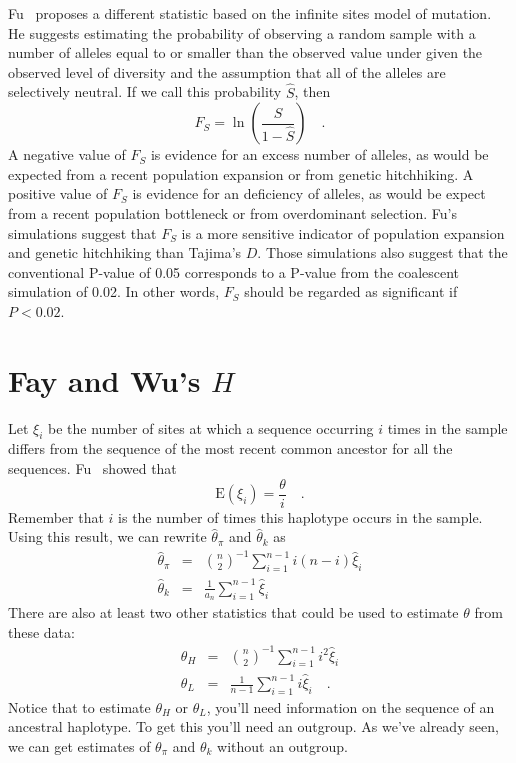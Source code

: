 \documentclass[12pt]{article}
\begin{document}
Fu~\cite{Fu-1997} proposes a different statistic based on the infinite
sites model of mutation. He suggests estimating the probability of
observing a random sample with a number of alleles equal to or smaller
than the observed value under given the observed level of diversity
and the assumption that all of the alleles are selectively neutral. If
we call this probability $\hat S$, then
\[
F_S = \ln\left(\frac{\hat S}{1 - \hat S}\right) \quad .
\]
A negative value of $F_S$ is evidence for an excess number of alleles,
as would be expected from a recent population expansion or from
genetic hitchhiking. A positive value of $F_S$ is evidence for an
deficiency of alleles, as would be expect from a recent population
bottleneck or from overdominant selection. Fu's simulations suggest
that $F_S$ is a more sensitive indicator of population expansion and
genetic hitchhiking than Tajima's $D$. Those simulations also suggest
that the conventional P-value of 0.05 corresponds to a P-value from
the coalescent simulation of 0.02. In other words, $F_S$ should be
regarded as significant if $P < 0.02$.

\section*{Fay and Wu's $H$}

Let $\xi_i$ be the number of sites at which a sequence occurring $i$
times in the sample differs from the sequence of the most recent
common ancestor for all the sequences. Fu~\cite{Fu-1995} showed that
\[
\mbox{E}(\xi_i) = \frac{\theta}{i} \quad .
\]
Remember that $i$ is the number of times this haplotype occurs in the
sample. Using this result, we can rewrite $\hat\theta_\pi$ and
$\hat\theta_k$ as
\begin{eqnarray*}
\hat\theta_\pi &=& {n \choose 2}^{-1}\sum_{i=1}^{n-1}i(n-i)\hat\xi_i \\
\hat\theta_k  &=& \frac{1}{a_n}\sum_{i=1}^{n-1}\hat\xi_i
\end{eqnarray*}
There are also at least two other statistics that could be used to
estimate $\theta$ from these data:
\begin{eqnarray*}
\theta_H &=& {n \choose 2}^{-1}\sum_{i=1}^{n-1}i^2\hat\xi_i \\
\theta_L &=& \frac{1}{n-1}\sum_{i=1}^{n-1}i\hat\xi_i \quad .
\end{eqnarray*}
Notice that to estimate $\theta_H$ or $\theta_L$, you'll
need information on the sequence of an ancestral haplotype. To get
this you'll need an outgroup. As we've already seen, we can get
estimates of $\theta_\pi$ and $\theta_k$ without an outgroup.
\end{document}
